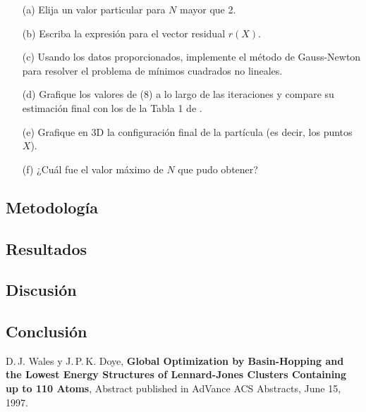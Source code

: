 \documentclass{article}
\begin{document}
\begin{itemize}
    \item[(a)] Elija un valor particular para $N$ mayor que 2.
    \item[(b)] Escriba la expresión para el vector residual $r(X)$.
    \item[(c)] Usando los datos proporcionados, implemente el método de Gauss-Newton para resolver el problema de mínimos cuadrados no lineales.
    \item[(d)] Grafique los valores de (8) a lo largo de las iteraciones y compare su estimación final con los de la Tabla 1 de \cite{wales1997}.
    \item[(e)] Grafique en 3D la configuración final de la partícula (es decir, los puntos $X$).
    \item[(f)] ¿Cuál fue el valor máximo de $N$ que pudo obtener?
\end{itemize}

\subsection{Metodología}

\subsection{Resultados}
\setcounter{equation}{0}

\subsection{Discusión}

\subsection{Conclusión}


\begin{thebibliography}{9}
D.\,J. Wales y J.\,P.\,K. Doye,
\textbf{Global Optimization by Basin-Hopping and the Lowest Energy Structures of Lennard-Jones Clusters Containing up to 110 Atoms}, Abstract published in AdVance ACS Abstracts, June 15, 1997.
\end{thebibliography}
\end{document}
